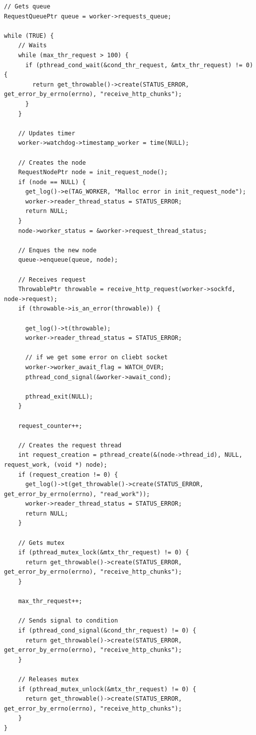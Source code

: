 \documentclass[italian]{tktltiki2}
\begin{document}
\begin{lstlisting}
// Gets queue
RequestQueuePtr queue = worker->requests_queue;

while (TRUE) {
    // Waits
    while (max_thr_request > 100) {
      if (pthread_cond_wait(&cond_thr_request, &mtx_thr_request) != 0) {
        return get_throwable()->create(STATUS_ERROR, get_error_by_errno(errno), "receive_http_chunks");
      }
    }

    // Updates timer
    worker->watchdog->timestamp_worker = time(NULL);

    // Creates the node
    RequestNodePtr node = init_request_node();
    if (node == NULL) {
      get_log()->e(TAG_WORKER, "Malloc error in init_request_node");
      worker->reader_thread_status = STATUS_ERROR;
      return NULL;
    }
    node->worker_status = &worker->request_thread_status;

    // Enques the new node
    queue->enqueue(queue, node);

    // Receives request
    ThrowablePtr throwable = receive_http_request(worker->sockfd, node->request);
    if (throwable->is_an_error(throwable)) {

      get_log()->t(throwable);
      worker->reader_thread_status = STATUS_ERROR;

      // if we get some error on cliebt socket
      worker->worker_await_flag = WATCH_OVER;
      pthread_cond_signal(&worker->await_cond);

      pthread_exit(NULL);
    }

    request_counter++;

    // Creates the request thread
    int request_creation = pthread_create(&(node->thread_id), NULL, request_work, (void *) node);
    if (request_creation != 0) {
      get_log()->t(get_throwable()->create(STATUS_ERROR, get_error_by_errno(errno), "read_work"));
      worker->reader_thread_status = STATUS_ERROR;
      return NULL;
    }

    // Gets mutex
    if (pthread_mutex_lock(&mtx_thr_request) != 0) {
      return get_throwable()->create(STATUS_ERROR, get_error_by_errno(errno), "receive_http_chunks");
    }

    max_thr_request++;

    // Sends signal to condition
    if (pthread_cond_signal(&cond_thr_request) != 0) {
      return get_throwable()->create(STATUS_ERROR, get_error_by_errno(errno), "receive_http_chunks");
    }

    // Releases mutex
    if (pthread_mutex_unlock(&mtx_thr_request) != 0) {
      return get_throwable()->create(STATUS_ERROR, get_error_by_errno(errno), "receive_http_chunks");
    }
}
\end{lstlisting}
\end{document}
